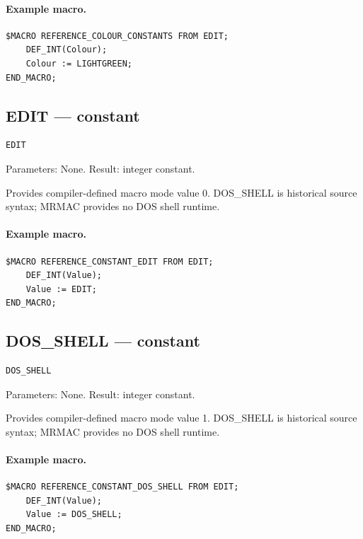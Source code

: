 \documentclass[a4paper,10pt,twoside,openany]{book}
\begin{document}
\paragraph{Example macro.}
\begin{verbatim}
$MACRO REFERENCE_COLOUR_CONSTANTS FROM EDIT;
    DEF_INT(Colour);
    Colour := LIGHTGREEN;
END_MACRO;
\end{verbatim}

\label{prim:constant-edit}
\subsection*{EDIT --- constant}
\begin{verbatim}
EDIT
\end{verbatim}
Parameters: None. Result: integer constant.

Provides compiler-defined macro mode value 0. DOS\_SHELL is historical source syntax; MRMAC provides no DOS shell runtime.

\paragraph{Example macro.}
\begin{verbatim}
$MACRO REFERENCE_CONSTANT_EDIT FROM EDIT;
    DEF_INT(Value);
    Value := EDIT;
END_MACRO;
\end{verbatim}

\label{prim:constant-dos-shell}
\subsection*{DOS\_SHELL --- constant}
\begin{verbatim}
DOS_SHELL
\end{verbatim}
Parameters: None. Result: integer constant.

Provides compiler-defined macro mode value 1. DOS\_SHELL is historical source syntax; MRMAC provides no DOS shell runtime.

\paragraph{Example macro.}
\begin{verbatim}
$MACRO REFERENCE_CONSTANT_DOS_SHELL FROM EDIT;
    DEF_INT(Value);
    Value := DOS_SHELL;
END_MACRO;
\end{verbatim}
\end{document}
